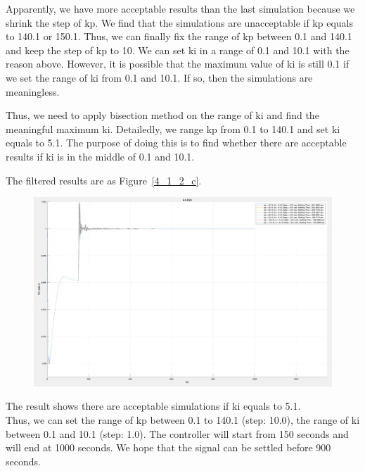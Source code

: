 Apparently, we have more acceptable results than the last simulation because we shrink the step of kp. We find that the simulations are unacceptable if kp equals to 140.1 or 150.1. Thus, we can finally fix the range of kp between 0.1 and 140.1 and keep the step of kp to 10. We can set ki in a range of 0.1 and 10.1 with the reason above. However, it is possible that the maximum value of ki is still 0.1 if we set the range of ki from 0.1 and 10.1. If so, then the simulations are meaningless.  

Thus, we need to apply bisection method on the range of ki and find the meaningful maximum ki. Detailedly, we range kp from 0.1 to 140.1 and set ki equals to 5.1. The purpose of doing this is to find whether there are acceptable results if ki is in the middle of 0.1 and 10.1.

The filtered results are as Figure~\ref{4_1_2_c}.  

\begin{figure}[htbp]
\centering
\includegraphics[width = .819\textwidth]{figure/4_1_2_c.png}
\end{figure}

The result shows there are acceptable simulations if ki equals to 5.1. \\

Thus, we can set the range of kp between 0.1 to 140.1 (step: 10.0), the range of ki between 0.1 and 10.1 (step: 1.0). The controller will start from 150 seconds and will end at 1000 seconds. We hope that the signal can be settled before 900 seconds.
